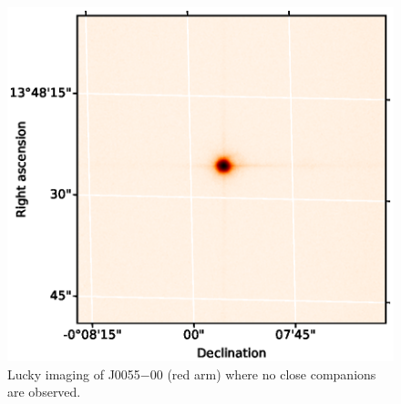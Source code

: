 \begin{figure}
    \centering
    \includegraphics{8-Results/J0055-00/lucky.eps}
    \caption{Lucky imaging of J0055$-$00 (red arm) where no close companions are observed.}
    \label{fig:J0055-00:lucky}
\end{figure}

